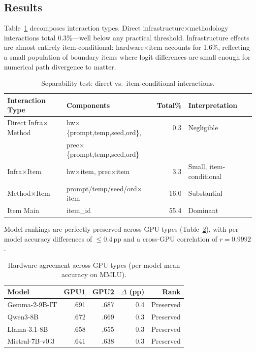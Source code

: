 \documentclass[11pt]{article}
\newcommand{\pp}{\,\text{pp}}
\begin{document}
\subsection{Results}

Table~\ref{tab:separability} decomposes interaction types. Direct infrastructure$\times$methodology interactions total 0.3\%---well below any practical threshold. Infrastructure effects are almost entirely item-conditional: hardware$\times$item accounts for 1.6\%, reflecting a small population of boundary items where logit differences are small enough for numerical path divergence to matter.

\begin{table}[t]
\centering
\caption{Separability test: direct vs.\ item-conditional interactions.}
\label{tab:separability}
\small
\begin{tabular}{llrl}
\toprule
Interaction Type & Components & Total\% & Interpretation \\
\midrule
Direct Infra$\times$Method & hw$\times$\{prompt,temp,seed,ord\},& 0.3 & Negligible \\
& prec$\times$\{prompt,temp,seed,ord\} & & \\
Infra$\times$Item & hw$\times$item, prec$\times$item & 3.3 & Small, item-conditional \\
Method$\times$Item & prompt/temp/seed/ord$\times$item & 16.0 & Substantial \\
Item Main & item\_id & 55.4 & Dominant \\
\bottomrule
\end{tabular}
\end{table}

Model rankings are perfectly preserved across GPU types (Table~\ref{tab:hardware_agreement}), with per-model accuracy differences of $\leq$0.4$\pp$ and a cross-GPU correlation of $r = 0.9992$.

\begin{table}[t]
\centering
\caption{Hardware agreement across GPU types (per-model mean accuracy on MMLU).}
\label{tab:hardware_agreement}
\small
\begin{tabular}{lrrrr}
\toprule
Model & GPU1 & GPU2 & $\Delta$ (pp) & Rank \\
\midrule
Gemma-2-9B-IT & .691 & .687 & 0.4 & Preserved \\
Qwen3-8B & .672 & .669 & 0.3 & Preserved \\
Llama-3.1-8B & .658 & .655 & 0.3 & Preserved \\
Mistral-7B-v0.3 & .641 & .638 & 0.3 & Preserved \\
\bottomrule
\end{tabular}
\end{table}
\end{document}
